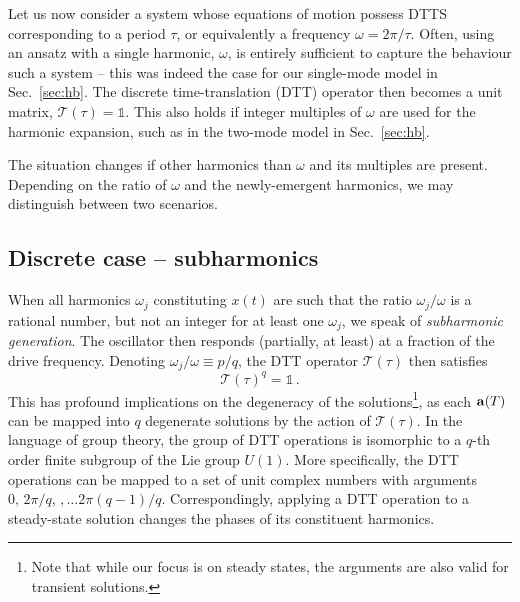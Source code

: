 Let us now consider a system whose equations of motion possess DTTS corresponding to a period $\tau$, or equivalently a frequency $\omega = 2\pi / \tau$. Often, using an ansatz with a single harmonic, $\omega$, is entirely sufficient to capture the behaviour such a system -- this was indeed the case for our single-mode model in Sec.~\ref{sec:hb}. The discrete time-translation (DTT) operator then becomes a unit matrix, $\mathcal{T}(\tau) = \mathbb{1}$. This also holds if integer multiples of $\omega$ are used for the harmonic expansion, such as in the two-mode model in Sec.~\ref{sec:hb}. 

The situation changes if other harmonics than $\omega$ and its multiples are present. Depending on the ratio of $\omega$ and the newly-emergent harmonics, we may distinguish between two scenarios. 

\subsection{Discrete case -- subharmonics} \label{sec:hopf_discrete}
When all harmonics $\omega_j$ constituting $x(t)$ are such that the ratio $\omega_j / \omega$ is a rational number, but not an integer for at least one $\omega_j$, we speak of \textit{subharmonic generation}. The oscillator then responds (partially, at least) at a fraction of the drive frequency. Denoting $\omega_j / \omega \equiv p / q$, the DTT operator $\mathcal{T}(\tau)$ then satisfies
\begin{equation} \label{eq:hopf_DTT}
\mathcal{T}(\tau)^q = \mathbb{1} \, .
\end{equation}
This has profound implications on the degeneracy of the solutions\footnote{Note that while our focus is on steady states, the arguments are also valid for transient solutions.}, as each $\vb{a}(T)$ can be mapped into $q$ degenerate solutions by the action of $\mathcal{T}(\tau)$. In the language of group theory, the group of DTT operations is isomorphic to a $q$-th order finite subgroup of the Lie group $U(1)$. More specifically, the DTT operations can be mapped to a set of unit complex numbers with arguments $0, \, 2\pi/q,\,, \ldots 2\pi(q-1)/q$. Correspondingly, applying a DTT operation to a steady-state solution changes the phases of its constituent harmonics.

